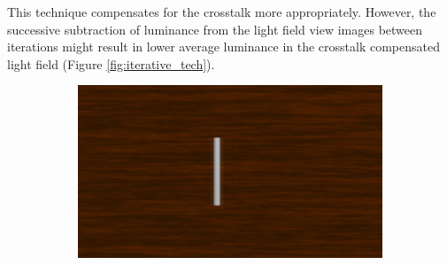 This technique compensates for the crosstalk more appropriately. However, the successive subtraction of luminance from the light field view images between iterations might result in lower average luminance in the crosstalk compensated light field (Figure \ref{fig:iterative_tech}).
\begin{figure}[htbp]
    \centering
    \begin{subfigure}[b]{0.48\textwidth}
        \includegraphics[width=\textwidth]{./Template_Figures/image_w_ct}
        \caption{}\label{fig:original_lf}
    \end{subfigure}


\end{figure}
